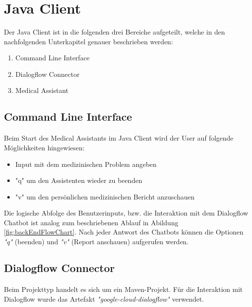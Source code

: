 \documentclass[11pt,a4paper]{article}
\begin{document}
\newpage


\section{Java Client}
	\paragraph{}
		Der Java Client ist in die folgenden drei Bereiche aufgeteilt, welche in den nachfolgenden Unterkapitel genauer beschrieben werden:
		\begin{enumerate}
			\item Command Line Interface
			\item Dialogflow Connector
			\item Medical Assistant
		\end{enumerate}

	\subsection{Command Line Interface}
		\paragraph{}
			Beim Start des Medical Assistants im Java Client wird der User auf folgende Möglichkeiten hingewiesen:
			\begin{itemize}
				\item Input mit dem medizinischen Problem angeben
				\item "q" um den Assistenten wieder zu beenden
				\item "v" um den persönlichen medizinischen Bericht anzuschauen
			\end{itemize}
			Die logische Abfolge des Benutzerinputs, bzw. die Interaktion mit dem Dialogflow Chatbot ist analog zum beschriebenen 
			Ablauf in Abildung \ref{fig:backEndFlowChart}. Nach jeder Antwort des Chatbots können die Optionen \emph{"q"} (beenden) und 
			\emph{"v"} (Report anschauen) aufgerufen werden.
	
	\subsection{Dialogflow Connector}
		\paragraph{}
			Beim Projekttyp handelt es sich um ein Maven-Projekt. Für die Interaktion mit Dialogflow wurde das Artefakt 
			\emph{"google-cloud-dialogflow"} verwendet.
		
\end{document}
